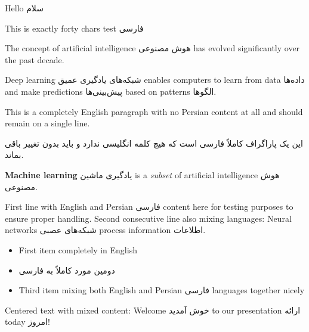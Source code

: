 \documentclass{article}
\begin{document}
Hello سلام

This is exactly forty chars test فارسی

The concept of artificial intelligence هوش مصنوعی has evolved significantly over the past decade.

Deep learning شبکه‌های یادگیری عمیق enables computers to learn from data داده‌ها and make predictions پیش‌بینی‌ها based on patterns الگوها.

This is a completely English paragraph with no Persian content at all and should remain on a single line.

این یک پاراگراف کاملاً فارسی است که هیچ کلمه انگلیسی ندارد و باید بدون تغییر باقی بماند.

\textbf{Machine learning} یادگیری ماشین is a \emph{subset} of artificial intelligence هوش مصنوعی.

First line with English and Persian فارسی content here for testing purposes to ensure proper handling.
Second consecutive line also mixing languages: Neural networks شبکه‌های عصبی process information اطلاعات.

\begin{itemize}
\item First item completely in English
\item دومین مورد کاملاً به فارسی
\item Third item mixing both English and Persian فارسی languages together nicely
\end{itemize}

\begin{center}
Centered text with mixed content: Welcome خوش آمدید to our presentation ارائه today امروز!
\end{center}
\end{document}
